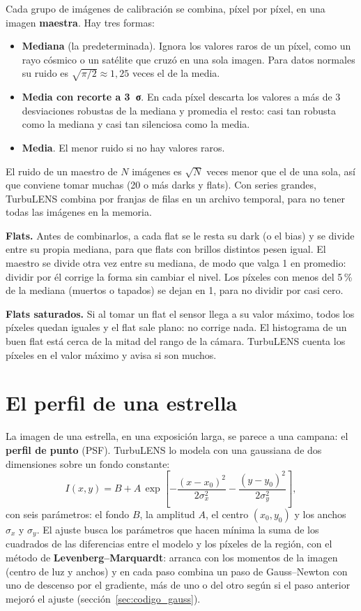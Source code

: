 Cada grupo de imágenes de calibración se combina, píxel por píxel, en una imagen \textbf{maestra}. Hay tres formas:
\begin{itemize}
\item \textbf{Mediana} (la predeterminada). Ignora los valores raros de un píxel, como un rayo cósmico o un satélite que
cruzó en una sola imagen. Para datos normales su ruido es $\sqrt{\pi/2} \approx 1{,}25$ veces el de la media.
\item \textbf{Media con recorte a 3~σ}. En cada píxel descarta los valores a más de 3 desviaciones robustas de la
mediana y promedia el resto: casi tan robusta como la mediana y casi tan silenciosa como la media.
\item \textbf{Media}. El menor ruido si no hay valores raros.
\end{itemize}
El ruido de un maestro de $N$ imágenes es $\sqrt N$ veces menor que el de una sola, así que conviene tomar muchas (20 o más
darks y flats). Con series grandes, TurbuLENS combina por franjas de filas en un archivo temporal, para no tener todas las
imágenes en la memoria.

\textbf{Flats.} Antes de combinarlos, a cada flat se le resta su dark (o el bias) y se divide entre su propia mediana, para
que flats con brillos distintos pesen igual. El maestro se divide otra vez entre su mediana, de modo que valga 1 en
promedio: dividir por él corrige la forma sin cambiar el nivel. Los píxeles con menos del 5\,\% de la mediana (muertos o
tapados) se dejan en 1, para no dividir por casi cero.

\textbf{Flats saturados.} Si al tomar un flat el sensor llega a su valor máximo, todos los píxeles quedan iguales y el
flat sale plano: no corrige nada. El histograma de un buen flat está cerca de la mitad del rango de la cámara. TurbuLENS
cuenta los píxeles en el valor máximo y avisa si son muchos.

\section{El perfil de una estrella}\label{sec:psf}

La imagen de una estrella, en una exposición larga, se parece a una campana: el \textbf{perfil de punto} (PSF). TurbuLENS
lo modela con una gaussiana de dos dimensiones sobre un fondo constante:
\begin{equation}
I(x,y) = B + A\,\exp\!\left[-\frac{(x-x_0)^2}{2\sigma_x^2} - \frac{(y-y_0)^2}{2\sigma_y^2}\right] ,
\end{equation}
con seis parámetros: el fondo $B$, la amplitud $A$, el centro $(x_0, y_0)$ y los anchos $\sigma_x$ y $\sigma_y$. El ajuste
busca los parámetros que hacen mínima la suma de los cuadrados de las diferencias entre el modelo y los píxeles de la región,
con el método de \textbf{Levenberg–Marquardt}: arranca con los momentos de la imagen (centro de luz y anchos) y en cada paso
combina un paso de Gauss–Newton con uno de descenso por el gradiente, más de uno o del otro según si el paso anterior
mejoró el ajuste (sección~\ref{sec:codigo_gauss}).

